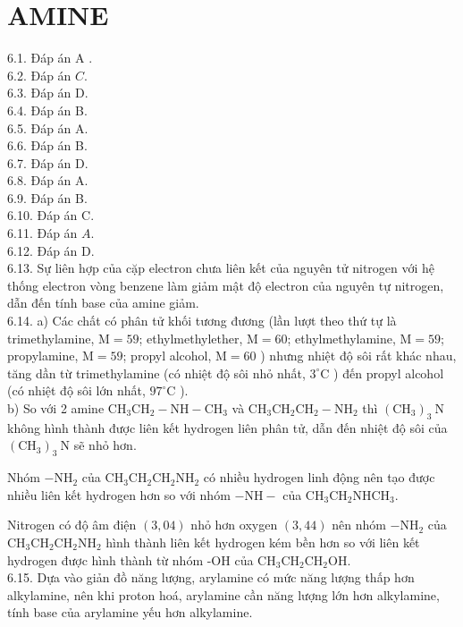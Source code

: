 \documentclass[10pt]{article}
\begin{document}
\section*{AMINE}
6.1. Đáp án A .\\
6.2. Đáp án $C$.\\
6.3. Đáp án D.\\
6.4. Đáp án B.\\
6.5. Đáp án A.\\
6.6. Đáp án B.\\
6.7. Đáp án D.\\
6.8. Đáp án A.\\
6.9. Đáp án B.\\
6.10. Đáp án C.\\
6.11. Đáp án $A$.\\
6.12. Đáp án D.\\
6.13. Sự liên hợp của cặp electron chưa liên kết của nguyên tử nitrogen với hệ thống electron vòng benzene làm giảm mật độ electron của nguyên tự nitrogen, dẫn đến tính base của amine giảm.\\
6.14. a) Các chất có phân tử khối tương đương (lần lượt theo thứ tự là trimethylamine, $\mathrm{M}=59$; ethylmethylether, $\mathrm{M}=60$; ethylmethylamine, $\mathrm{M}=59$; propylamine, $\mathrm{M}=59$; propyl alcohol, $\mathrm{M}=60$ ) nhưng nhiệt độ sôi rất khác nhau, tăng dần từ trimethylamine (có nhiệt độ sôi nhỏ nhất, $3^{\circ} \mathrm{C}$ ) đến propyl alcohol (có nhiệt độ sôi lớn nhất, $97^{\circ} \mathrm{C}$ ).\\
b) So với 2 amine $\mathrm{CH}_{3} \mathrm{CH}_{2}-\mathrm{NH}-\mathrm{CH}_{3}$ và $\mathrm{CH}_{3} \mathrm{CH}_{2} \mathrm{CH}_{2}-\mathrm{NH}_{2}$ thì $\left(\mathrm{CH}_{3}\right)_{3} \mathrm{~N}$ không hình thành được liên kết hydrogen liên phân tử, dẫn đến nhiệt độ sôi của $\left(\mathrm{CH}_{3}\right)_{3} \mathrm{~N}$ sẽ nhỏ hơn.

Nhóm $-\mathrm{NH}_{2}$ của $\mathrm{CH}_{3} \mathrm{CH}_{2} \mathrm{CH}_{2} \mathrm{NH}_{2}$ có nhiều hydrogen linh động nên tạo được nhiều liên kết hydrogen hơn so với nhóm $-\mathrm{NH}-$ của $\mathrm{CH}_{3} \mathrm{CH}_{2} \mathrm{NHCH}_{3}$.

Nitrogen có độ âm điện $(3,04)$ nhỏ hơn oxygen $(3,44)$ nên nhóm $-\mathrm{NH}_{2}$ của $\mathrm{CH}_{3} \mathrm{CH}_{2} \mathrm{CH}_{2} \mathrm{NH}_{2}$ hình thành liên kết hydrogen kém bền hơn so với liên kết hydrogen được hình thành từ nhóm -OH của $\mathrm{CH}_{3} \mathrm{CH}_{2} \mathrm{CH}_{2} \mathrm{OH}$.\\
6.15. Dựa vào giản đồ năng lượng, arylamine có mức năng lượng thấp hơn alkylamine, nên khi proton hoá, arylamine cần năng lượng lớn hơn alkylamine, tính base của arylamine yếu hơn alkylamine.
\end{document}
